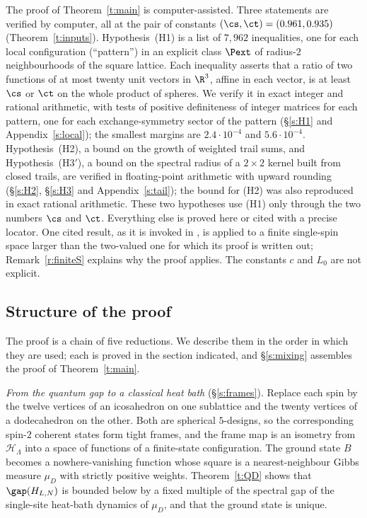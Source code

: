 The proof of Theorem~\ref{t:main} is computer-assisted. Three statements are verified by computer, all at the pair of constants $(\cs, \ct) = (0.961, 0.935)$ (Theorem~\ref{t:inputs}). Hypothesis~(H1) is a list of $7{,}962$ inequalities, one for each local configuration (``pattern'') in an explicit class $\Pext$ of radius-$2$ neighbourhoods of the square lattice. Each inequality asserts that a ratio of two functions of at most twenty unit vectors in $\R^3$, affine in each vector, is at least $\cs$ or $\ct$ on the whole product of spheres. We verify it in exact integer and rational arithmetic, with tests of positive definiteness of integer matrices for each pattern, one for each exchange-symmetry sector of the pattern (\S\ref{s:H1} and Appendix~\ref{s:local}); the smallest margins are $2.4 \cdot 10^{-4}$ and $5.6 \cdot 10^{-4}$. Hypothesis~(H2), a bound on the growth of weighted trail sums, and Hypothesis~(H3$'$), a bound on the spectral radius of a $2 \times 2$ kernel built from closed trails, are verified in floating-point arithmetic with upward rounding (\S\ref{s:H2}, \S\ref{s:H3} and Appendix~\ref{s:tail}); the bound for (H2) was also reproduced in exact rational arithmetic. These two hypotheses use (H1) only through the two numbers $\cs$ and $\ct$. Everything else is proved here or cited with a precise locator. One cited result, \cite[Theorem~4.1]{MO94} as it is invoked in \cite{MOS94}, is applied to a finite single-spin space larger than the two-valued one for which its proof is written out; Remark~\ref{r:finiteS} explains why the proof applies. The constants $c$ and $L_0$ are not explicit.

\subsection{Structure of the proof}

The proof is a chain of five reductions. We describe them in the order in which they are used; each is proved in the section indicated, and \S\ref{s:mixing} assembles the proof of Theorem~\ref{t:main}.

\emph{From the quantum gap to a classical heat bath} (\S\ref{s:frames}). Replace each spin by the twelve vertices of an icosahedron on one sublattice and the twenty vertices of a dodecahedron on the other. Both are spherical $5$-designs, so the corresponding spin-$2$ coherent states form tight frames, and the frame map is an isometry from $\mathcal H_\Lambda$ into a space of functions of a finite-state configuration. The ground state $B$ becomes a nowhere-vanishing function whose square is a nearest-neighbour Gibbs measure $\mu_D$ with strictly positive weights. Theorem~\ref{t:QD} shows that $\gap(H_{L, N})$ is bounded below by a fixed multiple of the spectral gap of the single-site heat-bath dynamics of $\mu_D$, and that the ground state is unique.

